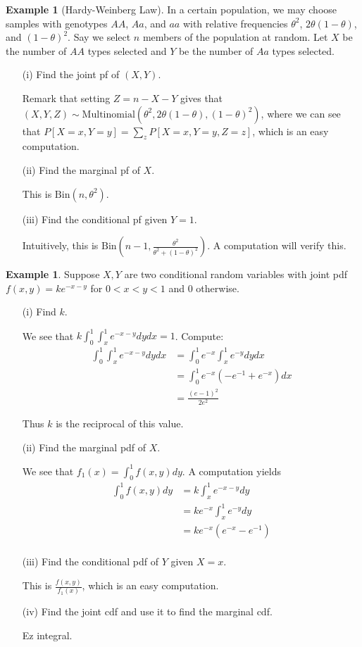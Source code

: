 \documentclass[11pt]{amsart}
\theoremstyle{definition}
\newtheorem{example}[theorem]{Example}
\numberwithin{equation}{section}
\begin{document}
\begin{example}[Hardy-Weinberg Law]
    In a certain population, we may choose samples with genotypes $AA$, $Aa$, and $aa$ with relative frequencies $\theta^2$, $2\theta(1-\theta)$, and $(1-\theta)^2$. Say we select $n$ members of the population at random. Let $X$ be the number of $AA$ types selected and $Y$ be the number of $Aa$ types selected.

    \begin{enumerate}
        \item [(i)] Find the joint pf of $(X,Y)$.

        Remark that setting $Z=n-X-Y$ gives that $(X,Y,Z)\sim\mathrm{Multinomial}(\theta^2,2\theta(1-\theta),(1-\theta)^2)$, where we can see that $P[X=x,Y=y]=\sum_zP[X=x,Y=y,Z=z]$, which is an easy computation.
        \item [(ii)] Find the marginal pf of $X$.

        This is $\mathrm{Bin}(n,\theta^2)$.
        \item [(iii)] Find the conditional pf given $Y=1$.

        Intuitively, this is $\mathrm{Bin}(n-1,\frac{\theta^2}{\theta^2+(1-\theta)^2})$. A computation will verify this.
    \end{enumerate}
\end{example}
\begin{example}
    Suppose $X,Y$ are two conditional random variables with joint pdf $f(x,y)=ke^{-x-y}$ for $0<x<y<1$ and 0 otherwise.
    \begin{enumerate}
        \item [(i)] Find $k$.

        We see that $k\int_{0}^1\int_x^1e^{-x-y}dydx=1$. Compute:
        \begin{align*}
            \int_0^1\int_x^1e^{-x-y}dydx&=\int_0^1e^{-x}\int_x^1e^{-y}dydx\\
            &=\int_0^1e^{-x}(-e^{-1}+e^{-x})dx\\
            &=\frac{(e-1)^2}{2e^2}
        \end{align*}

        Thus $k$ is the reciprocal of this value.
        \item [(ii)] Find the marginal pdf of $X$.

        We see that $f_1(x)=\int_0^1f(x,y)dy$. A computation yields
        \begin{align*}
            \int_0^1f(x,y)dy&=k\int_x^1e^{-x-y}dy\\
            &=ke^{-x}\int_x^1e^{-y}dy\\
            &=ke^{-x}(e^{-x}-e^{-1})\\
        \end{align*}
        \item [(iii)] Find the conditional pdf of $Y$ given $X=x$.

        This is $\frac{f(x,y)}{f_1(x)}$, which is an easy computation.
        \item [(iv)] Find the joint cdf and use it to find the marginal cdf.

        Ez integral.
    \end{enumerate}
\end{example}
\end{document}
